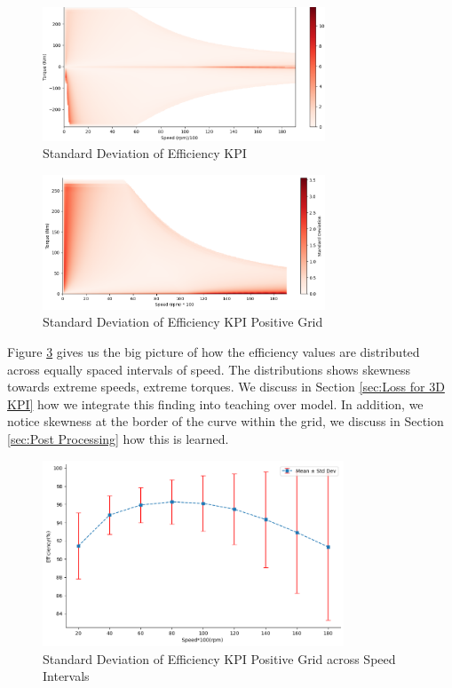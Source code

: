 \documentclass{report} %
\begin{document}
\begin{figure}[H]
    \centering
    \includegraphics[width=0.75\textwidth]{./ReportImages/stddev_y2.png} 
    \caption{Standard Deviation of Efficiency \ac{KPI}} 
    \label{fig:Standard Deviation of 3D KPI(Efficiency)}
\end{figure}

\begin{figure}[H]
    \centering
    \includegraphics[width=0.75\textwidth]{./ReportImages/pos_stddev_y2.png} 
    \caption{Standard Deviation of Efficiency \ac{KPI} Positive Grid} 
    \label{fig:Standard Deviation of 3D KPI(Efficiency) Positive Grid}
\end{figure}

Figure \ref{fig:Standard Deviation of 3D KPI(Efficiency) Positive Grid across Speed Intervals} gives us the big picture of how the efficiency values are distributed across equally spaced intervals of speed.
The distributions shows skewness towards extreme speeds, extreme torques. We discuss in Section \ref{sec:Loss for 3D KPI} how we integrate this finding into teaching over model.
In addition, we notice skewness at the border of the curve within the grid, we discuss in Section \ref{sec:Post Processing} how this is learned.
\begin{figure}[H]
    \centering
    \includegraphics[width=0.8\textwidth]{./ReportImages/stddev_y2_nn_Target.png} 
    \caption{Standard Deviation of Efficiency \ac{KPI} Positive Grid across Speed Intervals} 
    \label{fig:Standard Deviation of 3D KPI(Efficiency) Positive Grid across Speed Intervals}
\end{figure}
\end{document}
